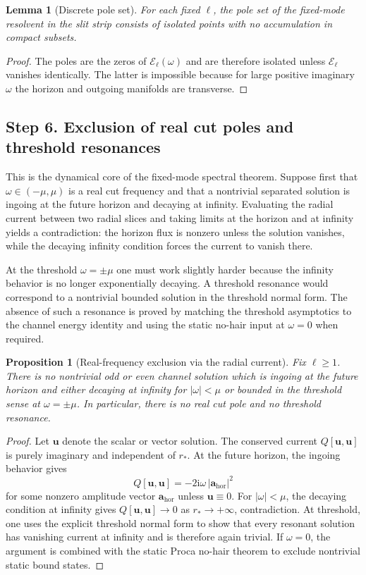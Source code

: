 \documentclass[12pt]{article}
\numberwithin{equation}{section}
\theoremstyle{plain}
\newtheorem{proposition}[theorem]{Proposition}
\newtheorem{lemma}[theorem]{Lemma}
\theoremstyle{definition}
\theoremstyle{remark}
\newcommand{\ii}{\mathrm i}
\newcommand{\hor}{\mathrm{hor}}
\newcommand{\cE}{\mathcal E}
\newcommand{\om}{\omega}
\newcommand{\abs}[1]{\left|#1\right|}
\begin{document}
\begin{lemma}[Discrete pole set]\label{lem:discrete_poles}
For each fixed $\ell$, the pole set of the fixed-mode resolvent in the slit strip consists of isolated points with no accumulation in compact subsets.
\end{lemma}

\begin{proof}
The poles are the zeros of $\cE_\ell(\om)$ and are therefore isolated unless $\cE_\ell$ vanishes identically.  The latter is impossible because for large positive imaginary $\om$ the horizon and outgoing manifolds are transverse.
\end{proof}

\subsection*{Step 6. Exclusion of real cut poles and threshold resonances}

This is the dynamical core of the fixed-mode spectral theorem.  Suppose first that $\om\in(-\mu,\mu)$ is a real cut frequency and that a nontrivial separated solution is ingoing at the future horizon and decaying at infinity.  Evaluating the radial current between two radial slices and taking limits at the horizon and at infinity yields a contradiction: the horizon flux is nonzero unless the solution vanishes, while the decaying infinity condition forces the current to vanish there.

At the threshold $\om=\pm\mu$ one must work slightly harder because the infinity behavior is no longer exponentially decaying.  A threshold resonance would correspond to a nontrivial bounded solution in the threshold normal form.  The absence of such a resonance is proved by matching the threshold asymptotics to the channel energy identity and using the static no-hair input at $\om=0$ when required.

\begin{proposition}[Real-frequency exclusion via the radial current]\label{prop:real_frequency_exclusion_detailed}
Fix $\ell\ge1$.  There is no nontrivial odd or even channel solution which is ingoing at the future horizon and either decaying at infinity for $\abs{\om}<\mu$ or bounded in the threshold sense at $\om=\pm\mu$.  In particular, there is no real cut pole and no threshold resonance.
\end{proposition}

\begin{proof}
Let $\bm u$ denote the scalar or vector solution.  The conserved current $Q[\bm u,\bm u]$ is purely imaginary and independent of $r_*$.  At the future horizon, the ingoing behavior gives
\[
   Q[\bm u,\bm u]=-2\ii\om\,\abs{\bm a_{\hor}}^2
\]
for some nonzero amplitude vector $\bm a_{\hor}$ unless $\bm u\equiv0$.  For $\abs{\om}<\mu$, the decaying condition at infinity gives $Q[\bm u,\bm u]\to0$ as $r_*\to+\infty$, contradiction.  At threshold, one uses the explicit threshold normal form to show that every resonant solution has vanishing current at infinity and is therefore again trivial.  If $\om=0$, the argument is combined with the static Proca no-hair theorem to exclude nontrivial static bound states.
\end{proof}
\end{document}
